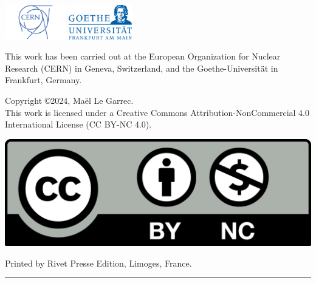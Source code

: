 {{{            %
            \normalfont\fontsize{11pt}{\fontskipsecondtitle}\selectfont%

            \vfill
            \begin{center}
                \includegraphics[height=1.5cm]{./images/CERN-Logo.png}
                \hspace{2.5cm}
                \includegraphics[height=1.5cm]{./images/Goethe-Logo.png}
            \end{center}
            
            \noindent%
            This work has been carried out at the European Organization for Nuclear Research (CERN) in
            Geneva, Switzerland, and the Goethe-Universität in Frankfurt, Germany.\par
            \vspace{0.5cm}%
            \noindent%
            \begin{minipage}{0.7\textwidth}
                Copyright \copyright 2024, Maël Le Garrec.\\
                This work is licensed under a Creative Commons Attribution-NonCommercial 4.0 International
                License (CC BY-NC 4.0).
            \end{minipage}
            \hfill
            \begin{minipage}{0.2\textwidth}
               \includegraphics[width=\textwidth]{./images/cc_by_nc.png}
            \end{minipage}
            \hfill

            \vspace{1cm}
            \noindent%
            Printed by Rivet Presse Edition, Limoges, France.

            \noindent\rule[0.5em]{\textwidth}{1.5pt}
        }
        \makeatother
        
        \makecopyrightpage
        \restoregeometry
    }
}{}



